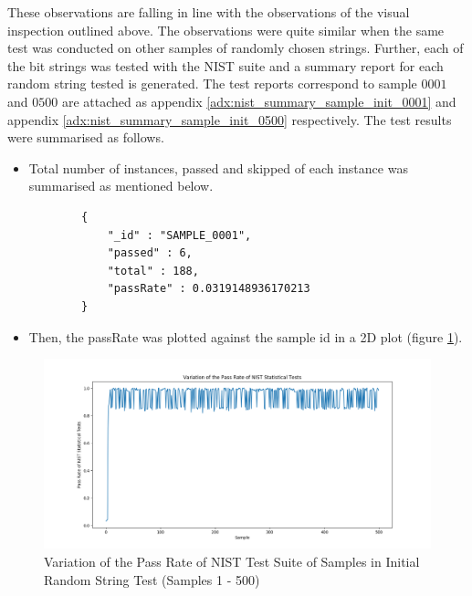 
These observations are falling in line with the observations of the visual inspection outlined above. The observations were quite similar when the same test was conducted on other samples of randomly chosen strings. Further, each of the bit strings was tested with the NIST suite and a summary report for each random string tested is generated. The test reports correspond to sample $0001$ and $0500$ are attached as appendix \ref{adx:nist_summary_sample_init_0001} and appendix \ref{adx:nist_summary_sample_init_0500} respectively. The test results were summarised as follows.

\begin{itemize}
    \item Total number of instances, passed and skipped of each instance was summarised as mentioned below.
    
    \begin{code}
        \begin{verbatim}
        {
            "_id" : "SAMPLE_0001",
            "passed" : 6,
            "total" : 188,
            "passRate" : 0.0319148936170213
        }
        \end{verbatim}
    \end{code}
    
    \item Then, the passRate was plotted against the sample id in a 2D plot (figure \ref{fig:4_nist_init_samples_1_500}). 
\end{itemize}

\begin{figure}[h!]
    \includegraphics[width=1.0\textwidth]{images/pass_rates_nist_init_sample_1_500.png}
    \centering
    \caption{Variation of the Pass Rate of NIST Test Suite of Samples in Initial Random String Test (Samples 1 - 500)}
    \label{fig:4_nist_init_samples_1_500}
\end{figure}

